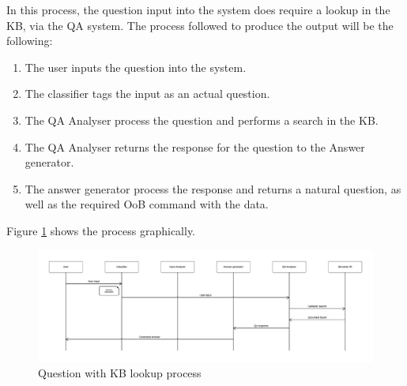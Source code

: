 In this process, the question input into the system does require a lookup in the \ac{KB}, via the \ac{QA} system. The process followed to produce the output will be the following:

\begin{enumerate}
 \item The user inputs the question into the system.
 \item The classifier tags the input as an actual question.
 \item The QA Analyser process the question and performs a search in the \ac{KB}.
 \item The QA Analyser returns the response for the question to the Answer generator.
 \item The answer generator process the response and returns a natural question, as well as the required \ac{OoB} command with the data.
\end{enumerate}

Figure \ref{fig:arch3} shows the process graphically.

\begin{figure}[!htbp]
    \centering
    \includegraphics[width=\textwidth]{img/arch/FullQuestion.png}
    \caption{Question with \ac{KB} lookup process}
    \label{fig:arch3}
\end{figure}

% 
